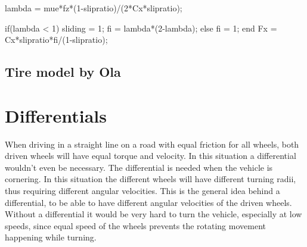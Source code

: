     lambda = mue*fz*(1-slipratio)/(2*Cx*slipratio);
    
    if(lambda < 1)
   		 sliding = 1;
    	fi = lambda*(2-lambda); 
    else
   		 fi = 1;
    end
    Fx = Cx*slipratio*fi/(1-slipratio);



\subsection{Tire model by Ola}

\section{Differentials}
When driving in a straight line on a road with equal friction for all wheels, both driven wheels will have equal torque and velocity. In this situation a differential wouldn't even be necessary. The differential is needed when the vehicle is cornering. In this situation the different wheels will have different turning radii, thus requiring different angular velocities. This is the general idea behind a differential, to be able to have different angular velocities of the driven wheels. Without a differential it would be very hard to turn the vehicle, especially at low speeds, since equal speed of the wheels prevents the rotating movement happening while turning.

